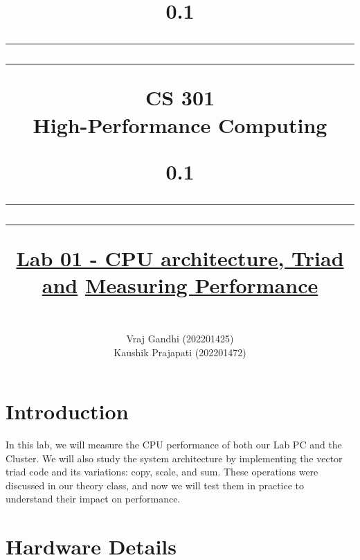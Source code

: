 \documentclass[article, 11pt]{article}
\begin{document}
\title{
    \begin{spacing}{0.1}
        \rule{\textwidth}{0.5pt}
        \rule{\textwidth}{0.5pt}
    \end{spacing}
    \vspace{1cm}
    \Huge\textbf{CS 301 \\High-Performance Computing}
    \vspace{0.7cm}
    \begin{spacing}{0.1}
        \rule{\textwidth}{0.5pt}
        \rule{\textwidth}{0.5pt}
    \end{spacing}

    \vspace{6cm}
    \begin{center}
    {\Huge{\; \underline{Lab 01 - CPU architecture, Triad and}}}
    {\Huge{\; \underline{Measuring Performance}}}
    \end{center}
    
}

\author{
    \vspace{5cm}
    \Large{
    \\Vraj Gandhi (202201425)
    \\Kaushik Prajapati (202201472)
    }
}

\maketitle

\newpage
\tableofcontents

\newpage
\section{Introduction}

In this lab, we will measure the CPU performance of both our Lab PC and the Cluster. We will also study the system architecture by implementing the vector triad code and its variations: copy, scale, and sum. These operations were discussed in our theory class, and now we will test them in practice to understand their impact on performance.
\section{Hardware Details}
\end{document}
